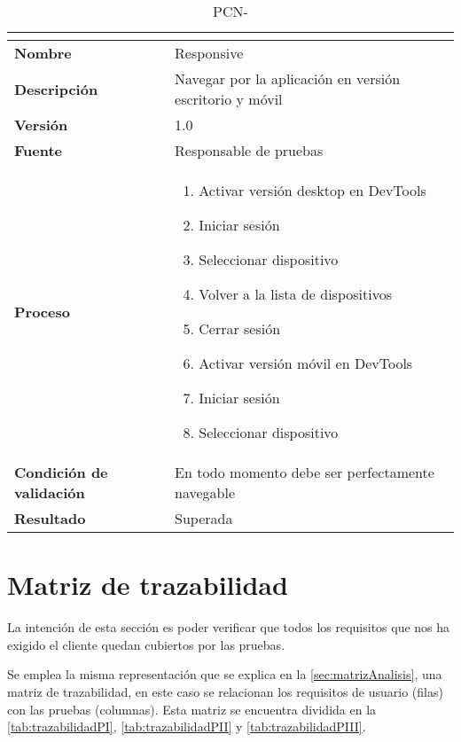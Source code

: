 \begin{table}[H]
	\caption{PCN-\number\pcn}
	\begin{tabular}{|l|p{}|}
		\hline
		\multicolumn{2}{|c|}{\cellcolor[HTML]{BFBFBF}{\color[HTML]{000000} \textbf{PCN-\number\pcn}}} \\ \hline
		\textbf{Nombre}                  & Responsive                                              \\ \hline
		\textbf{Descripción}             & Navegar por la aplicación en versión escritorio y móvil \\ \hline
		\textbf{Versión}                 & 1.0                                                     \\ \hline
		\textbf{Fuente}                  & Responsable de pruebas                                  \\ \hline
		\textbf{Proceso}                 & \begin{enumerate}
			\item Activar versión desktop en DevTools
			\item Iniciar sesión
			\item Seleccionar dispositivo
			\item Volver a la lista de dispositivos
			\item Cerrar sesión
			\item Activar versión móvil en DevTools
			\item Iniciar sesión
			\item Seleccionar dispositivo
		\end{enumerate}                              \\ \hline
		\textbf{Condición de validación} & En todo momento debe ser perfectamente navegable        \\ \hline
		\textbf{Resultado}               & Superada                                                \\ \hline
	\end{tabular}
\end{table}
\pagebreak

\section{Matriz de trazabilidad}
La intención de esta sección es poder verificar que todos los requisitos que nos ha exigido el cliente quedan cubiertos por las pruebas. 

Se emplea la misma representación que se explica en la \autoref{sec:matrizAnalisis}, una matriz de trazabilidad, en este caso se relacionan los requisitos de usuario (filas) con las pruebas (columnas). Esta matriz se encuentra dividida en la \autoref{tab:trazabilidadPI}, \autoref{tab:trazabilidadPII} y \autoref{tab:trazabilidadPIII}.

